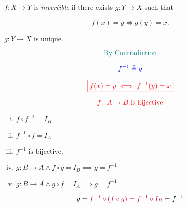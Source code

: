 \begin{frame}{}
  \begin{definition}[Invertible]
    $f: X \to Y$ is {\it invertible} if there exists $g: Y \to X$ such that

    \[
      f(x) = y \iff g(y) = x.
    \]
  \end{definition}

  \pause
  \vspace{0.30cm}
  \begin{theorem}
    $g: Y \to X$ is unique.
  \end{theorem}

  \pause
  \[
    \text{\textcolor{teal}{By Contradiction}}
  \]

  \pause
  \[
    \textcolor{blue}{f^{-1} \triangleq g}
  \]

  \pause
  \[
    \textcolor{red}{\boxed{f(x) = y \iff f^{-1}(y) = x}}
  \]
\end{frame}

\begin{frame}{}
  \begin{theorem}[UD Theorem 16.4]
    \[
      \textcolor{red}{f: A \to B \text{ is bijective}}
    \]

    \begin{enumerate}[(i)]
      \item $f \circ f^{-1} = I_B$
      \item $f^{-1} \circ f = I_A$
      \vspace{0.30cm}
      \item $f^{-1} \text{ is bijective}.$
      \vspace{0.30cm}
      \item $g: B \to A \land f \circ g = I_B \implies g = f^{-1}$
      \item $g: B \to A \land g \circ f = I_A \implies g = f^{-1}$
    \end{enumerate}
  \end{theorem}

  \pause
  \begin{center}
  \end{center}

  \pause
  \vspace{-0.30cm}
  \[
    g = \textcolor{purple}{f^{-1} \circ (f \circ g) = f^{-1} \circ I_B} = f^{-1}
  \]
\end{frame}

